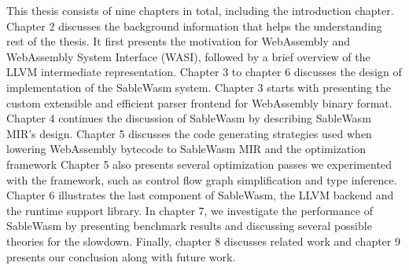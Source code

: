This thesis consists of nine chapters in total, including the introduction
chapter.
Chapter 2 discusses the background information that helps the
understanding rest of the thesis. It first presents the motivation for
WebAssembly and WebAssembly System Interface (WASI), followed by a brief
overview of the LLVM intermediate representation.
Chapter 3 to chapter 6 discusses the design of implementation of the
SableWasm system. Chapter 3 starts with presenting the custom extensible and
efficient parser frontend for WebAssembly binary format.
Chapter 4 continues the discussion of SableWasm by describing SableWasm MIR's
design.
Chapter 5 discusses the code generating strategies used when
lowering WebAssembly bytecode to SableWasm MIR and the optimization framework
Chapter 5 also presents several optimization passes we experimented with the
framework, such as control flow graph simplification and type inference.
Chapter 6 illustrates the last component of SableWasm, the LLVM backend and the
runtime support library.
In chapter 7, we investigate the performance of SableWasm by presenting
benchmark results and discussing several possible theories for the slowdown.
Finally, chapter 8 discusses related work and chapter 9 presents our conclusion
along with future work.